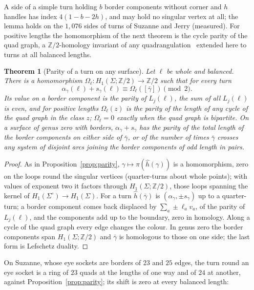 \documentclass[11pt,a4paper]{article}
\newtheorem{theorem}{Theorem}
\newcommand{\Z}{\mathbb{Z}}
\newcommand{\shift}{s}
\begin{document}
A side of a simple turn holding $b$ border components without corner and $h$
handles has index $4(1 - b - 2h)$, and may hold no singular vertex at all; the
lemma holds on the $1{,}076$ sides of turns of Suzanne and Jerry (measured).
For positive lengths the homomorphism of the next theorem is the cycle parity
of the quad graph, a $\Z/2$-homology invariant of any
quadrangulation~\cite[Lemma~3.1]{kaiser2015colouring}
extended here to turns at all balanced
lengths.

\begin{theorem}[Parity of a turn on any surface]\label{thm:parity-any}
Let $\ell$ be whole and balanced. There is a homomorphism $\Omega_\ell\colon
H_1(\Sigma; \Z/2) \to \Z/2$ such that for every turn
\[
  \alpha_\gamma(\ell) + \shift_\gamma(\ell) \equiv \Omega_\ell([\bar\gamma]) \pmod 2 .
\]
Its value on a border component is the parity of $L_j(\ell)$, the sum of all
$L_j(\ell)$ is even, and for positive lengths $\Omega_\ell(z)$ is the parity of
the length of any cycle of the quad graph in the class $z$; $\Omega_\ell = 0$
exactly when the quad graph is bipartite. On a surface of genus zero with
borders, $\alpha_\gamma + \shift_\gamma$ has the parity of the total length of
the border components on either side of $\bar\gamma$, or of the number of times
$\bar\gamma$ crosses any system of disjoint arcs joining the border components
of odd length in pairs.
\end{theorem}
\begin{proof}
As in Proposition~\ref{prop:parity}, $\gamma \mapsto \pi(\hat h(\gamma))$ is a
homomorphism, zero on the loops round the singular vertices (quarter-turns
about whole points); with values of exponent two it factors through
$H_1(\Sigma; \Z/2)$, those loops spanning the kernel of $H_1(\Sigma^\circ)
\to H_1(\Sigma)$. For a turn $\hat h(\bar\gamma)$ is $(\alpha_\gamma,
\pm\shift_\gamma)$ up to a quarter-turn; a border component comes back
displaced by $\sum_a \pm\ell_a v_a$, of the parity of $L_j(\ell)$, and the
components add up to the boundary, zero in homology. Along a cycle of the quad
graph every edge changes the colour. In genus zero the border components span
$H_1(\Sigma; \Z/2)$ and $\bar\gamma$ is homologous to those on one side; the
last form is Lefschetz duality.
\end{proof}

On Suzanne, whose eye sockets are borders of $23$ and $25$ edges, the turn
round an eye socket is a ring of $23$ quads at the lengths of one way and of
$24$ at another, against Proposition~\ref{prop:parity}; its shift is zero at
every balanced length:
\end{document}
